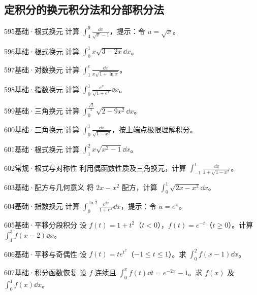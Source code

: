 \subsection{定积分的换元积分法和分部积分法}
\begin{exercise}{595}{基础·根式换元}
计算 $\int_4^9\frac{\dd x}{\sqrt x-1}$，提示：令 $u=\sqrt x$。
\end{exercise}
\begin{exercise}{596}{基础·根式换元}
计算 $\int_0^1x\sqrt{3-2x}\dd x$。
\end{exercise}
\begin{exercise}{597}{基础·对数换元}
计算 $\int_1^e\frac{\dd x}{x\sqrt{1+\ln x}}$。
\end{exercise}
\begin{exercise}{598}{基础·指数换元}
计算 $\int_0^1\frac{e^x}{\sqrt{1+e^x}}\dd x$。
\end{exercise}
\begin{exercise}{599}{基础·三角换元}
计算 $\int_0^{\frac{\sqrt2}{3}}\sqrt{2-9x^2}\dd x$。
\end{exercise}
\begin{exercise}{600}{基础·三角换元}
计算 $\int_0^1\frac{\dd x}{\sqrt{1-x^2}}$，按上端点极限理解积分。
\end{exercise}
\begin{exercise}{601}{基础·根式换元}
计算 $\int_1^2x\sqrt{x^2-1}\dd x$。
\end{exercise}
\begin{exercise}{602}{常规·根式与对称性}
利用偶函数性质及三角换元，计算 $\int_{-1}^1\frac{\dd x}{1+\sqrt{1-x^2}}$。
\end{exercise}
\begin{exercise}{603}{基础·配方与几何意义}
将 $2x-x^2$ 配方，计算 $\int_0^1\sqrt{2x-x^2}\dd x$。
\end{exercise}
\begin{exercise}{604}{基础·指数换元}
计算 $\int_0^{\ln2}\frac{e^{2x}}{1+e^x}\dd x$，提示：令 $u=e^x$。
\end{exercise}
\begin{exercise}{605}{基础·平移分段积分}
设 $f(t)=1+t^2$（$t<0$），$f(t)=e^{-t}$（$t\ge0$）。计算 $\int_1^3f(x-2)\dd x$。
\end{exercise}
\begin{exercise}{606}{基础·平移与奇偶性}
设 $f(t)=te^{t^2}$（$-1\le t\le1$）。求 $\int_0^2f(x-1)\dd x$。
\end{exercise}
\begin{exercise}{607}{基础·积分函数恢复}
设 $f$ 连续且 $\int_0^xf(t)\dd t=e^{-2x}-1$。求 $f(x)$ 及 $\int_0^1f(x)\dd x$。
\end{exercise}
